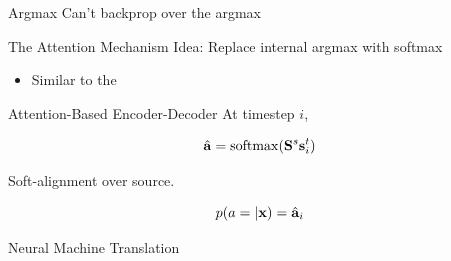 \documentclass{beamer}
\begin{document}
\begin{frame}{Argmax }
  Can't backprop over the argmax 
  \begin{center}
    
  \end{center}
\end{frame}

\begin{frame}{The Attention Mechanism}
  Idea: Replace internal argmax with softmax 

  \begin{itemize}
  \item Similar to the 
  \end{itemize}
\end{frame}

\begin{frame}
  
\end{frame}

\begin{frame}{Attention-Based Encoder-Decoder}
  At timestep $i$, 
 
  \[\hat{\bolda} = \softmax(\boldS^s  \bolds^t_i ) \] 

  Soft-alignment over source. 

  \[p(a = | \mathbf{x})  =\hat{\mathbf{a}}_i \]
\end{frame}

\begin{frame}{Neural Machine Translation}
  
\end{frame}


\begin{frame}{}
  
\end{frame}
\end{document}
